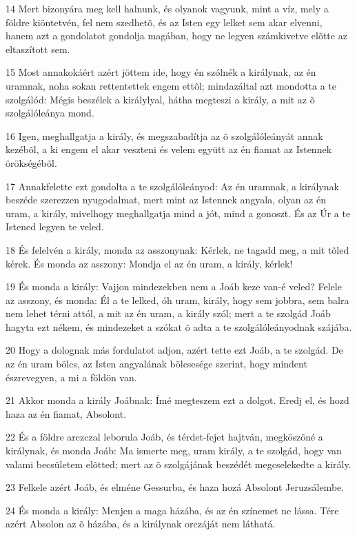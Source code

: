 \par 14 Mert bizonyára meg kell halnunk, és olyanok vagyunk, mint a víz, mely a földre kiöntetvén, fel nem szedhetõ, és az Isten egy lelket sem akar elvenni, hanem azt a gondolatot gondolja magában, hogy ne legyen számkivetve elõtte az eltaszított sem.
\par 15 Most annakokáért azért jöttem ide, hogy én szólnék a királynak, az én uramnak, noha sokan rettentettek engem ettõl; mindazáltal azt mondotta a te szolgálód: Mégis beszélek a királylyal, hátha megteszi a király, a mit az õ szolgálóleánya mond.
\par 16 Igen, meghallgatja a király, és megszabadítja az õ szolgálóleányát annak kezébõl, a ki engem el akar veszteni és velem együtt az én fiamat az Istennek örökségébõl.
\par 17 Annakfelette ezt gondolta a te szolgálóleányod: Az én uramnak, a királynak beszéde szerezzen nyugodalmat, mert mint az Istennek angyala, olyan az én uram, a király, mivelhogy meghallgatja mind a jót, mind a gonoszt. És az Úr a te Istened legyen te veled.
\par 18 És felelvén a király, monda az asszonynak: Kérlek, ne tagadd meg, a mit tõled kérek. És monda az asszony: Mondja el az én uram, a király, kérlek!
\par 19 És monda a király: Vajjon mindezekben nem a Joáb keze van-é veled? Felele az asszony, és monda: Él a te lelked, óh uram, király, hogy sem jobbra, sem balra nem lehet térni attól, a mit az én uram, a király szól; mert a te szolgád Joáb  hagyta ezt nékem, és mindezeket a szókat õ adta a te szolgálóleányodnak szájába.
\par 20 Hogy a dolognak más fordulatot adjon, azért tette ezt Joáb, a te szolgád. De az én uram bölcs, az Isten angyalának bölcsesége szerint, hogy mindent észrevegyen, a mi a földön van.
\par 21 Akkor monda a király Joábnak: Ímé megteszem ezt a dolgot. Eredj el, és hozd haza az én fiamat, Absolont.
\par 22 És a földre arczczal leborula Joáb, és térdet-fejet hajtván, megköszöné a királynak, és monda Joáb: Ma ismerte meg, uram király, a te szolgád, hogy van valami becsületem elõtted; mert az õ szolgájának beszédét megcselekedte a király.
\par 23 Felkele azért Joáb, és elméne Gessurba, és haza hozá Absolont Jeruzsálembe.
\par 24 És monda a király: Menjen a maga házába, és az én színemet ne lássa. Tére azért Absolon az õ házába, és a királynak orczáját nem láthatá.
